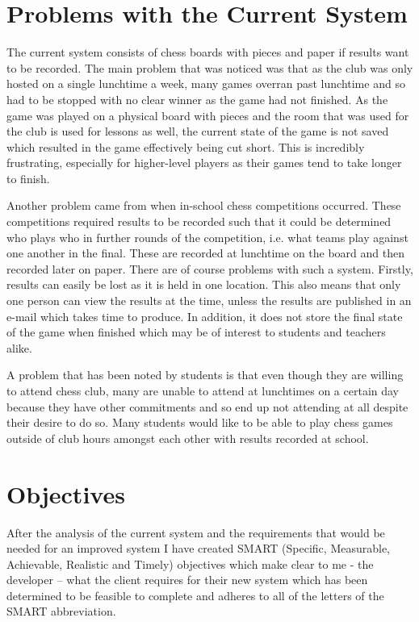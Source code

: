 \section{Problems with the Current System}
The current system consists of chess boards with pieces and paper if results want to be recorded. The main problem that was noticed was that as the club was only hosted on a single lunchtime a week, many games overran past lunchtime and so had to be stopped with no clear winner as the game had not finished. As the game was played on a physical board with pieces and the room that was used for the club is used for lessons as well, the current state of the game is not saved which resulted in the game effectively being cut short. This is incredibly frustrating, especially for higher-level players as their games tend to take longer to finish. 

Another problem came from when in-school chess competitions occurred. These competitions required results to be recorded such that it could be determined who plays who in further rounds of the competition, i.e. what teams play against one another in the final. These are recorded at lunchtime on the board and then recorded later on paper. There are of course problems with such a system. Firstly, results can easily be lost as it is held in one location. This also means that only one person can view the results at the time, unless the results are published in an e-mail which takes time to produce. In addition, it does not store the final state of the game when finished which may be of interest to students and teachers alike.

A problem that has been noted by students is that even though they are willing to attend chess club, many are unable to attend at lunchtimes on a certain day because they have other commitments and so end up not attending at all despite their desire to do so. Many students would like to be able to play chess games outside of club hours amongst each other with results recorded at school.
\section{Objectives} \label{objectives}
After the analysis of the current system and the requirements that would be needed for an improved system I have created SMART (Specific, Measurable, Achievable, Realistic and Timely) objectives which make clear to me - the developer – what the client requires for their new system which has been determined to be feasible to complete and adheres to all of the letters of the SMART abbreviation.

